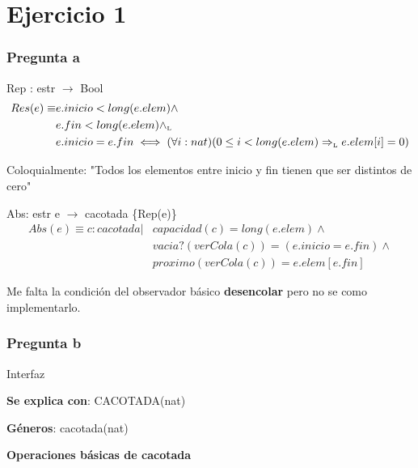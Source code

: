 \section{Ejercicio 1}
\subsubsection*{Pregunta a}

Rep : estr $\rightarrow$ Bool
\begin{align*}
    Res(e) \equiv &e.inicio < long(e.elem) \wedge  \\
    &e.fin < long(e.elem) \land_{\mathrm{\scriptscriptstyle{L}}} \\
    &e.inicio = e.fin \iff (\forall i: nat)(0 \leq i < long(e.elem) \Rightarrow_{\mathrm{\scriptscriptstyle{L}}} e.elem[i] = 0)
\end{align*}

Coloquialmente: "Todos los elementos entre inicio y fin tienen que ser distintos de cero"

Abs: estr e $\rightarrow$ cacotada \{Rep(e)\}
\begin{align*}
    Abs(e) \equiv c: cacotada | &capacidad(c) = long(e.elem) \wedge \\
    &vacia?(verCola(c)) = (e.inicio = e.fin) \wedge \\
    &proximo(verCola(c)) = e.elem[e.fin]
\end{align*}

Me falta la condición del observador básico \textbf{desencolar} pero no se como implementarlo.

\subsubsection*{Pregunta b}
Interfaz

\textbf{Se explica con}: CACOTADA(nat)

\textbf{Géneros}: cacotada(nat)

\textbf{Operaciones básicas de cacotada}

